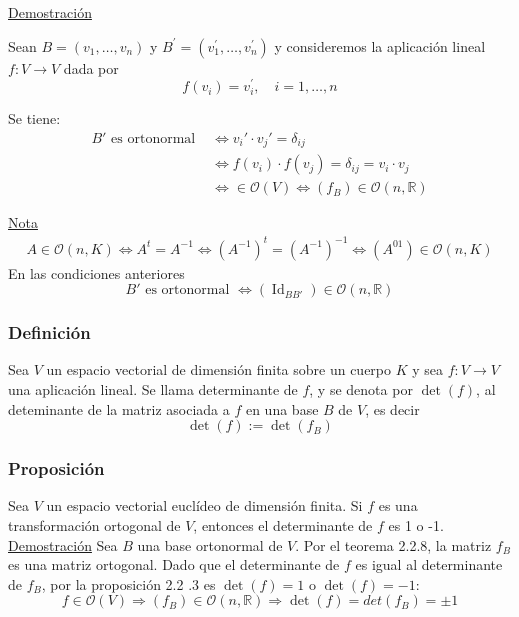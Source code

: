 \documentclass[12pt, a4paper, ones, notitlepage, openany,titlepage]{article}
\begin{document}
\noindent\underline{Demostración}

Sean $B=\left(v_{1}, \ldots, v_{n}\right)$ y $B^{\prime}=\left(v_{1}^{\prime}, \ldots, v_{n}^{\prime}\right)$ y consideremos la aplicación lineal $f: V \rightarrow V$ dada por
$$
f\left(v_{i}\right)=v_{i}^{\prime}, \quad i=1, \ldots, n
$$

\noindent Se tiene:
$$
\begin{aligned}
	B' \text{ es ortonormal } & \Longleftrightarrow v_i' \cdot v_j' = \delta_{ij} \\
	& \Longleftrightarrow f(v_i) \cdot f(v_j) = \delta_{ij} = v_i \cdot v_j \\
	& \Longleftrightarrow \in \mathcal{O} (V) \Longleftrightarrow (f_B) \in \mathcal{O} (n, \mathbb{R})
\end{aligned}
$$

\noindent\underline{Nota}
$$
\begin{aligned}
	A \in \mathcal{O} (n,K) \Longleftrightarrow A^t = A^{-1} \Longleftrightarrow (A^{-1})^t = (A^{-1})^{-1} \Longleftrightarrow (A^{01}) \in \mathcal{O} (n,K)
\end{aligned}
$$
\noindent En las condiciones anteriores
$$
B' \text{ es ortonormal } \Longleftrightarrow (\operatorname{Id}_{BB'}) \in \mathcal{O} (n, \mathbb{R})
$$

\subsubsection{Definición}
Sea $V$ un espacio vectorial de dimensión finita sobre un cuerpo $K$ y sea $f: V \rightarrow V$ una aplicación lineal. Se llama determinante de $f$, y se denota por $\operatorname{det}(f)$, al deteminante de la matriz asociada a $f$ en una base $B$ de $V$, es decir
$$
\operatorname{det}(f):=\operatorname{det}\left(f_{B}\right)
$$

\subsubsection{Proposición}
Sea $V$ un espacio vectorial euclídeo de dimensión finita. Si $f$ es una transformación ortogonal de $V$, entonces el determinante de $f$ es 1 o -1.\\

\noindent\underline{Demostración}
Sea $B$ una base ortonormal de $V$. Por el teorema 2.2.8, la matriz $f_{B}$ es una matriz ortogonal. Dado que el determinante de $f$ es igual al determinante de $f_{B}$, por la proposición 2.2 .3 es $\operatorname{det}(f)=1$ o $\operatorname{det}(f)=-1$:
$$
f \in \mathcal{O} (V) \Longrightarrow (f_B) \in \mathcal{O} (n, \mathbb{R}) \Longrightarrow \operatorname{det} (f) = det(f_B) = \pm 1
$$
\end{document}
